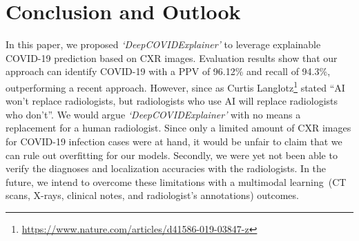 \documentclass[conference]{IEEEtran}
\begin{document}

\section{Conclusion and Outlook}
\label{sec:co}
In this paper, we proposed \emph{`DeepCOVIDExplainer'} to leverage explainable COVID-19 prediction based on CXR images. Evaluation results show that our approach can identify COVID-19 with a PPV of 96.12\% and recall of 94.3\%, outperforming a recent approach. 
However, since as Curtis Langlotz\footnote{\url{https://www.nature.com/articles/d41586-019-03847-z}} stated ``AI won't replace radiologists, but radiologists who use AI will replace radiologists who don't''. 
We would argue \emph{`DeepCOVIDExplainer'} 
with no means a replacement for a human radiologist. 
Since only a limited amount of CXR images for COVID-19 infection cases were at hand, it would be unfair to claim that we can rule out overfitting for our models. 
Secondly, we were yet not been able to verify the diagnoses and localization accuracies with the radiologists. 
In the future, we intend to overcome these limitations with a multimodal learning~(CT scans, X-rays, clinical notes, and radiologist's annotations) outcomes.



\end{document}
